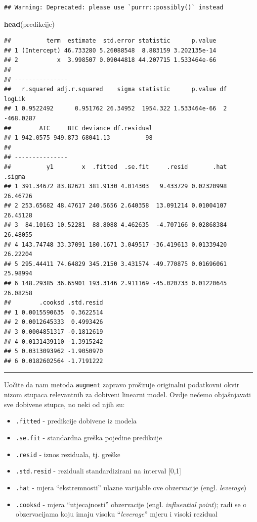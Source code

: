 \documentclass[]{book}
\newenvironment{Shaded}{\begin{snugshade}}{\end{snugshade}}
\newcommand{\KeywordTok}[1]{\textcolor[rgb]{0.13,0.29,0.53}{\textbf{#1}}}
\newcommand{\NormalTok}[1]{#1}
\providecommand{\tightlist}{%
  \setlength{\itemsep}{0pt}\setlength{\parskip}{0pt}}
\theoremstyle{definition}
\theoremstyle{definition}
\theoremstyle{definition}
\theoremstyle{remark}
\begin{document}
\begin{verbatim}
## Warning: Deprecated: please use `purrr::possibly()` instead
\end{verbatim}

\begin{Shaded}
\begin{Highlighting}[]
\KeywordTok{head}\NormalTok{(predikcije)}
\end{Highlighting}
\end{Shaded}

\begin{verbatim}
##          term  estimate  std.error statistic      p.value
## 1 (Intercept) 46.733280 5.26088548  8.883159 3.202135e-14
## 2           x  3.998507 0.09044818 44.207715 1.533464e-66
## 
## ---------------
##   r.squared adj.r.squared    sigma statistic      p.value df    logLik
## 1 0.9522492      0.951762 26.34952  1954.322 1.533464e-66  2 -468.0287
##        AIC     BIC deviance df.residual
## 1 942.0575 949.873 68041.13          98
## 
## ---------------
##          y1        x  .fitted  .se.fit     .resid       .hat   .sigma
## 1 391.34672 83.82621 381.9130 4.014303   9.433729 0.02320998 26.46726
## 2 253.65682 48.47617 240.5656 2.640358  13.091214 0.01004107 26.45128
## 3  84.10163 10.52281  88.8088 4.462635  -4.707166 0.02868384 26.48055
## 4 143.74748 33.37091 180.1671 3.049517 -36.419613 0.01339420 26.22204
## 5 295.44411 74.64829 345.2150 3.431574 -49.770875 0.01696061 25.98994
## 6 148.29385 36.65901 193.3146 2.911169 -45.020733 0.01220645 26.08258
##        .cooksd .std.resid
## 1 0.0015590635  0.3622514
## 2 0.0012645333  0.4993426
## 3 0.0004851317 -0.1812619
## 4 0.0131439110 -1.3915242
## 5 0.0313093962 -1.9050970
## 6 0.0182602564 -1.7191222
\end{verbatim}

\begin{center}\rule{0.5\linewidth}{\linethickness}\end{center}

Uočite da nam metoda \texttt{augment} zapravo proširuje originalni
podatkovni okvir nizom stupaca relevantnih za dobiveni linearni model.
Ovdje nećemo objašnjavati sve dobivene stupce, no neki od njih su:

\begin{itemize}
\tightlist
\item
  \texttt{.fitted} - predikcije dobivene iz modela
\item
  \texttt{.se.fit} - standardna greška pojedine predikcije
\item
  \texttt{.resid} - iznos reziduala, tj. greške
\item
  \texttt{.std.resid} - reziduali standardizirani na interval {[}0,1{]}
\item
  \texttt{.hat} - mjera ``ekstremnosti'' ulazne varijable ove
  obzervacije (engl. \emph{leverage})
\item
  \texttt{.cooksd} - mjera ``utjecajnosti'' obzervacije (engl.
  \emph{influential point}); radi se o obzervacijama koju imaju visoku
  ``\emph{leverage}'' mjeru i visoki rezidual
\end{itemize}
\end{document}
